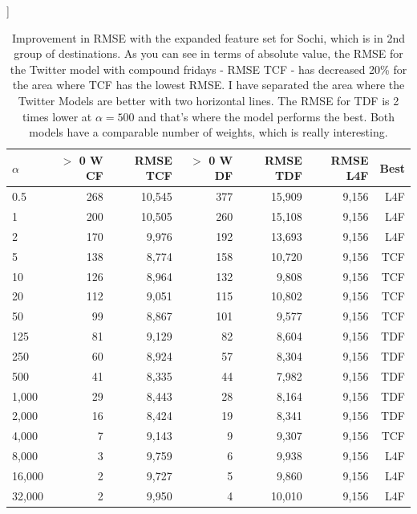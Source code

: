 \documentclass[minf,frontabs,twoside,singlespacing,parskip]{infthesis}
\begin{document}
\begin{table}[h!]]
\begin{center}
\begin{tabular}{ l | r | r | r | r | r | r}
$\alpha$ & $>$ 0 W CF & RMSE TCF & $>$ 0 W DF & RMSE TDF & RMSE L4F & Best\\
\hline
0.5 & 268 & 10,545 & 377 & 15,909 & 9,156 & L4F\\
1 & 200 & 10,505 & 260 & 15,108 & 9,156 & L4F\\
2 & 170 & 9,976 & 192 & 13,693 & 9,156 & L4F\\
\hline
5 & 138 & 8,774 & 158 & 10,720 & 9,156 & TCF\\
10 & 126 & 8,964 & 132 & 9,808 & 9,156 & TCF\\
20 & 112 & 9,051 & 115 & 10,802 & 9,156 & TCF\\
50 & 99 & 8,867 & 101 & 9,577 & 9,156 & TCF\\
125 & 81 & 9,129 & 82 & 8,604 & 9,156 & TDF\\
250 & 60 & 8,924 & 57 & 8,304 & 9,156 & TDF\\
500 & 41 & 8,335 & 44 & 7,982 & 9,156 & TDF\\
1,000 & 29 & 8,443 & 28 & 8,164 & 9,156 & TDF\\
2,000 & 16 & 8,424 & 19 & 8,341 & 9,156 & TDF\\
4,000 & 7 & 9,143 & 9 & 9,307 & 9,156 & TCF\\
\hline
8,000 & 3 & 9,759 & 6 & 9,938 & 9,156 & L4F\\
16,000 & 2 & 9,727 & 5 & 9,860 & 9,156 & L4F\\
32,000 & 2 & 9,950 & 4 & 10,010 & 9,156 & L4F\\
\end{tabular}
\end{center}
\caption{Improvement in RMSE with the expanded feature set for Sochi, which is in 2nd group of destinations.  
As you can see in terms of absolute value, the RMSE for the Twitter model with compound fridays - RMSE TCF - has decreased 20\% for the area where TCF has the lowest RMSE. I have separated the area where the Twitter Models are better with two horizontal lines. The RMSE for TDF is 2 times lower at $\alpha=500$ and that's where the model performs the best. Both models have a comparable number of weights, which is really interesting.}
\label{table-sochi}
\end{table}
\end{document}
